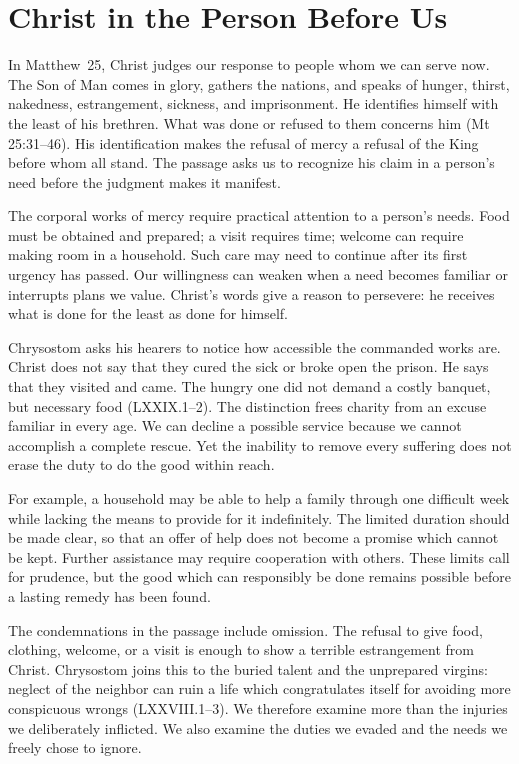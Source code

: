 \section{Christ in the Person Before Us}

In Matthew~25, Christ judges our response to people whom we can serve now. The Son of Man comes in glory, gathers the nations, and speaks of hunger, thirst, nakedness, estrangement, sickness, and imprisonment. He identifies himself with the least of his brethren. What was done or refused to them concerns him (Mt 25:31--46). His identification makes the refusal of mercy a refusal of the King before whom all stand. The passage asks us to recognize his claim in a person's need before the judgment makes it manifest.

The corporal works of mercy require practical attention to a person's needs. Food must be obtained and prepared; a visit requires time; welcome can require making room in a household. Such care may need to continue after its first urgency has passed. Our willingness can weaken when a need becomes familiar or interrupts plans we value. Christ's words give a reason to persevere: he receives what is done for the least as done for himself.

Chrysostom asks his hearers to notice how accessible the commanded works are. Christ does not say that they cured the sick or broke open the prison. He says that they visited and came. The hungry one did not demand a costly banquet, but necessary food (LXXIX.1--2). The distinction frees charity from an excuse familiar in every age. We can decline a possible service because we cannot accomplish a complete rescue. Yet the inability to remove every suffering does not erase the duty to do the good within reach.

For example, a household may be able to help a family through one difficult week while lacking the means to provide for it indefinitely. The limited duration should be made clear, so that an offer of help does not become a promise which cannot be kept. Further assistance may require cooperation with others. These limits call for prudence, but the good which can responsibly be done remains possible before a lasting remedy has been found.

\ifdefined\TriptychPrintEdition
{}
\else
\fi
The condemnations in the passage include omission. The refusal to give food, clothing, welcome, or a visit is enough to show a terrible estrangement from Christ. Chrysostom joins this to the buried talent and the unprepared virgins: neglect of the neighbor can ruin a life which congratulates itself for avoiding more conspicuous wrongs (LXXVIII.1--3). We therefore examine more than the injuries we deliberately inflicted. We also examine the duties we evaded and the needs we freely chose to ignore.\par

